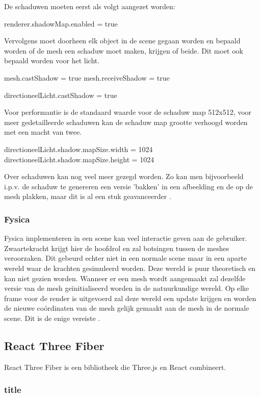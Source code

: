 De schaduwen moeten eerst als volgt aangezet worden:

\begin{LVerbatim}
renderer.shadowMap.enabled = true
\end{LVerbatim}

Vervolgens moet doorheen elk object in de scene gegaan worden en bepaald worden of de mesh een schaduw moet maken, krijgen of beide. Dit moet ook bepaald worden voor het licht.

\begin{LVerbatim}
mesh.castShadow = true
mesh.receiveShadow = true

directioneelLicht.castShadow = true
\end{LVerbatim}

Voor performantie is de standaard waarde voor de schaduw map 512x512, voor meer gedetailleerde schaduwen kan de schaduw map grootte verhoogd worden met een macht van twee.

\begin{LVerbatim}
directioneelLicht.shadow.mapSize.width = 1024
directioneelLicht.shadow.mapSize.height = 1024
\end{LVerbatim}

Over schaduwen kan nog veel meer gezegd worden. Zo kan men bijvoorbeeld i.p.v. de schaduw te genereren een versie 'bakken' in een afbeelding en de op de mesh plakken, maar dit is al een stuk geavanceerder \autocite{Simon2023}.

\subsubsection{Fysica}

Fysica implementeren in een scene kan veel interactie geven aan de gebruiker. Zwaartekracht krijgt hier de hoofdrol en zal botsingen tussen de meshes veroorzaken. Dit gebeurd echter niet in een normale scene maar in een aparte wereld waar de krachten gesimuleerd worden. Deze wereld is puur theoretisch en kan niet gezien worden. Wanneer er een mesh wordt aangemaakt zal dezelfde versie van de mesh geïnitialiseerd worden in de natuurkundige wereld.
Op elke frame voor de render is uitgevoerd zal deze wereld een update krijgen en worden de nieuwe coördinaten van de mesh gelijk gemaakt aan de mesh in de normale scene. Dit is de enige vereiste \autocite{Simon2023}.

\subsection{React Three Fiber}

React Three Fiber is een bibliotheek die Three.js en React combineert. 

\subsubsection{title}
